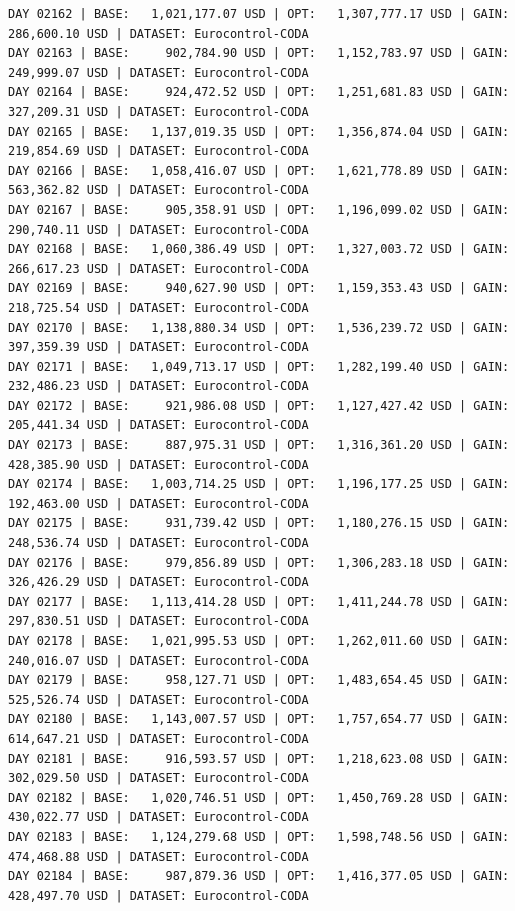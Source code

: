 \documentclass[11pt,a4paper]{article}
\begin{document}
\begin{verbatim}
DAY 02162 | BASE:   1,021,177.07 USD | OPT:   1,307,777.17 USD | GAIN: 286,600.10 USD | DATASET: Eurocontrol-CODA
DAY 02163 | BASE:     902,784.90 USD | OPT:   1,152,783.97 USD | GAIN: 249,999.07 USD | DATASET: Eurocontrol-CODA
DAY 02164 | BASE:     924,472.52 USD | OPT:   1,251,681.83 USD | GAIN: 327,209.31 USD | DATASET: Eurocontrol-CODA
DAY 02165 | BASE:   1,137,019.35 USD | OPT:   1,356,874.04 USD | GAIN: 219,854.69 USD | DATASET: Eurocontrol-CODA
DAY 02166 | BASE:   1,058,416.07 USD | OPT:   1,621,778.89 USD | GAIN: 563,362.82 USD | DATASET: Eurocontrol-CODA
DAY 02167 | BASE:     905,358.91 USD | OPT:   1,196,099.02 USD | GAIN: 290,740.11 USD | DATASET: Eurocontrol-CODA
DAY 02168 | BASE:   1,060,386.49 USD | OPT:   1,327,003.72 USD | GAIN: 266,617.23 USD | DATASET: Eurocontrol-CODA
DAY 02169 | BASE:     940,627.90 USD | OPT:   1,159,353.43 USD | GAIN: 218,725.54 USD | DATASET: Eurocontrol-CODA
DAY 02170 | BASE:   1,138,880.34 USD | OPT:   1,536,239.72 USD | GAIN: 397,359.39 USD | DATASET: Eurocontrol-CODA
DAY 02171 | BASE:   1,049,713.17 USD | OPT:   1,282,199.40 USD | GAIN: 232,486.23 USD | DATASET: Eurocontrol-CODA
DAY 02172 | BASE:     921,986.08 USD | OPT:   1,127,427.42 USD | GAIN: 205,441.34 USD | DATASET: Eurocontrol-CODA
DAY 02173 | BASE:     887,975.31 USD | OPT:   1,316,361.20 USD | GAIN: 428,385.90 USD | DATASET: Eurocontrol-CODA
DAY 02174 | BASE:   1,003,714.25 USD | OPT:   1,196,177.25 USD | GAIN: 192,463.00 USD | DATASET: Eurocontrol-CODA
DAY 02175 | BASE:     931,739.42 USD | OPT:   1,180,276.15 USD | GAIN: 248,536.74 USD | DATASET: Eurocontrol-CODA
DAY 02176 | BASE:     979,856.89 USD | OPT:   1,306,283.18 USD | GAIN: 326,426.29 USD | DATASET: Eurocontrol-CODA
DAY 02177 | BASE:   1,113,414.28 USD | OPT:   1,411,244.78 USD | GAIN: 297,830.51 USD | DATASET: Eurocontrol-CODA
DAY 02178 | BASE:   1,021,995.53 USD | OPT:   1,262,011.60 USD | GAIN: 240,016.07 USD | DATASET: Eurocontrol-CODA
DAY 02179 | BASE:     958,127.71 USD | OPT:   1,483,654.45 USD | GAIN: 525,526.74 USD | DATASET: Eurocontrol-CODA
DAY 02180 | BASE:   1,143,007.57 USD | OPT:   1,757,654.77 USD | GAIN: 614,647.21 USD | DATASET: Eurocontrol-CODA
DAY 02181 | BASE:     916,593.57 USD | OPT:   1,218,623.08 USD | GAIN: 302,029.50 USD | DATASET: Eurocontrol-CODA
DAY 02182 | BASE:   1,020,746.51 USD | OPT:   1,450,769.28 USD | GAIN: 430,022.77 USD | DATASET: Eurocontrol-CODA
DAY 02183 | BASE:   1,124,279.68 USD | OPT:   1,598,748.56 USD | GAIN: 474,468.88 USD | DATASET: Eurocontrol-CODA
DAY 02184 | BASE:     987,879.36 USD | OPT:   1,416,377.05 USD | GAIN: 428,497.70 USD | DATASET: Eurocontrol-CODA

\end{verbatim}
\end{document}
